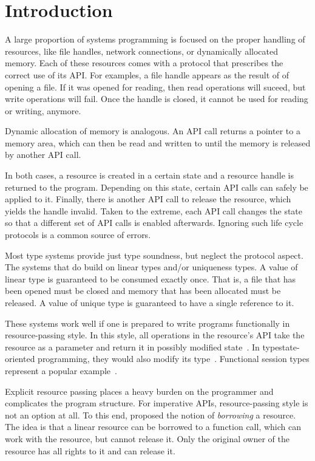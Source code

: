 \section{Introduction}

A large proportion of systems programming is focused on the proper
handling of resources, like file handles, network connections, or
dynamically allocated memory. Each of these resources comes with a
protocol that prescribes the correct use of its API.
For examples, a file handle appears as the result of of opening a
file. If it was opened for reading, then read operations will suceed,
but write operations will fail. Once the handle is closed, it cannot
be used for reading or writing, anymore.

Dynamic allocation of memory is analogous. An API call returns a
pointer to a memory area, which can then be read and written to until
the memory is released by another API call.

In both cases, a resource is created in a certain state and a resource
handle is returned to the program. Depending on this state, certain API calls
can safely be applied to it. Finally, there is another API call to
release the resource, which yields the handle invalid.
Taken to the extreme, each API call changes the state so that a
different set of API calls is enabled afterwards. 
Ignoring such life cycle protocols is a common source of errors.


Most type systems provide just type soundness, but neglect the
protocol aspect. The systems that do build on linear types \cite{DBLP:journals/tcs/Girard87} and/or
uniqueness types\cite{DBLP:conf/plilp/BarendsenS95}. A value of linear
type is guaranteed to be consumed 
exactly once. That is, a file that has been opened must be closed and
memory that has been allocated must be released. A value of unique
type is guaranteed to have a single reference to it.

These systems work well if one is prepared to write programs
functionally in resource-passing style. In this style, all operations
in the resource's API take the resource as a parameter and return it
in possibly modified state~\cite{DBLP:journals/jfp/AchtenP95}. In
typestate-oriented programming, they would also modify its
type~\cite{DBLP:conf/oopsla/AldrichSSS09}. Functional session types 
represent a popular example~\cite{DBLP:journals/jfp/GayV10}. 

Explicit resource passing places a heavy burden on the programmer and
complicates the program structure. For imperative APIs,
resource-passing style is not an option at all. To this end,
\citet{DBLP:conf/popl/BoylandR05}  proposed the notion of
\emph{borrowing} a resource. The idea is that a linear resource can be
borrowed to a function call, which can work with the resource, but
cannot release it. Only the original owner of the resource has all
rights to it and can release it.

